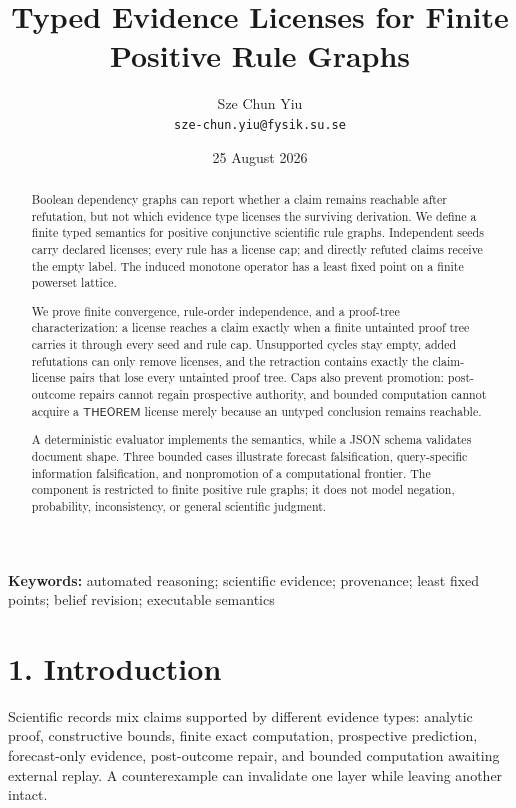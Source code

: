 \documentclass[
  11pt,
]{article}
\title{Typed Evidence Licenses for Finite Positive Rule Graphs}
\author{Sze Chun Yiu\\\texttt{sze-chun.yiu@fysik.su.se}}
\date{25 August 2026}
\begin{document}
\maketitle

\begin{abstract}
Boolean dependency graphs can report whether a claim remains reachable
after refutation, but not which evidence type licenses the surviving
derivation. We define a finite typed semantics for positive conjunctive
scientific rule graphs. Independent seeds carry declared licenses; every
rule has a license cap; and directly refuted claims receive the empty
label. The induced monotone operator has a least fixed point on a finite
powerset lattice.

We prove finite convergence, rule-order independence, and a proof-tree
characterization: a license reaches a claim exactly when a finite
untainted proof tree carries it through every seed and rule cap.
Unsupported cycles stay empty, added refutations can only remove
licenses, and the retraction contains exactly the claim-license pairs
that lose every untainted proof tree. Caps also prevent promotion:
post-outcome repairs cannot regain prospective authority, and bounded
computation cannot acquire a \(\textsf{THEOREM}\) license merely because
an untyped conclusion remains reachable.

A deterministic evaluator implements the semantics, while a JSON schema
validates document shape. Three bounded cases illustrate forecast
falsification, query-specific information falsification, and
nonpromotion of a computational frontier. The component is restricted to
finite positive rule graphs; it does not model negation, probability,
inconsistency, or general scientific judgment.

\end{abstract}

\noindent\textbf{Keywords:} automated reasoning; scientific evidence; provenance;
least fixed points; belief revision; executable semantics

\hypertarget{introduction}{%
\section{1. Introduction}\label{introduction}}

Scientific records mix claims supported by different evidence types:
analytic proof, constructive bounds, finite exact computation,
prospective prediction, forecast-only evidence, post-outcome repair, and
bounded computation awaiting external replay. A counterexample can
invalidate one layer while leaving another intact.
\end{document}

